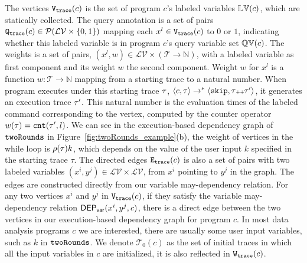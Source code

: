 {The vertices $\mathtt{{V_{trace}}}(c)$ is the set of program $c$'s labeled variables $\mathbb{LV}(c)$,
which are statically collected.
The query annotation is 
a set of pairs $\mathtt{{Q_{trace}}}(c) \in \mathcal{P}(\mathcal{LV} \times \{0, 1\} )$ 
mapping each $x^l \in \mathtt{{V_{trace}}}(c)$ to $0$ or $1$, 
indicating whether this labeled variable is in program $c$'s query variable set $\mathbb{QV}(c)$.
{
The weights is a set of pairs, $(x^l, w) \in \mathcal{LV} \times (\mathcal{T} \to \mathbb{N})$,
with a labeled variable as first component and
its weight $w$ the second component.
Weight $w$ for
$x^l$ is a function $w : \mathcal{T} \to \mathbb{N}$
mapping from a starting trace to a natural number.
When program executes under this starting trace $\mathtt{\tau}$,
$\langle {c}, \mathtt{\tau} \rangle \to^{*} \langle \mathtt{skip}, \mathtt{\tau}{\scriptscriptstyle ++}\mathtt{\tau}' \rangle $, it generates an execution trace $\mathtt{\tau}'$.
This natural number is the evaluation times of the labeled command corresponding to the vertex, 
computed by the counter operator $w(\mathtt{\tau}) = \mathtt{cnt}(\mathtt{\tau}', l)$.
We can see in the execution-based dependency graph of $\mathtt{twoRounds}$ in 
Figure~\ref{fig:twoRounds_example}(b), the weight of vertices in the while loop is  $\rho(\mathtt{\tau}) k$, which depends on the value of the user input $k$ specified in the starting trace $\tau$.
The directed edges $\mathtt{{E_{trace}}}({c})$ is also a set of pairs with two labeled variables $ (x^i, y^j) \in \mathcal{LV} \times \mathcal{LV}$, from $x^i$ pointing to $y^j$ in the graph.
The edges are constructed directly from our variable may-dependency relation. 
For any two vertices $x^{i}$ and $y^{j}$ in $\mathtt{{V_{trace}}}(c)$, if they satisfy the variable may-dependency relation $\mathsf{DEP_{var}}(x^i, y^j, c)$, there is a direct edge between the two vertices in our execution-based dependency graph for program $c$.
} 
In most data analysis programs $c$ we are interested, there are usually some user input variables, such as $k$ in $\mathtt{twoRounds}$. 
We denote $\mathcal{T}_0(c)$ as the set of initial traces in which all the input variables in $c$ are initialized, it is also reflected in $\mathtt{{W_{trace}}}({c})$.    
}
